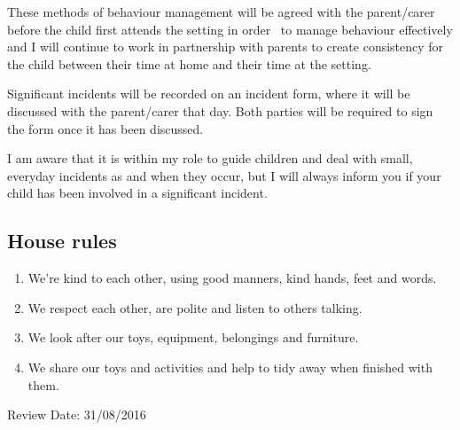 These methods of behaviour management will be agreed with the
parent/carer before the child first attends the setting in order ~to
manage behaviour effectively and I will continue to work in partnership
with parents to create consistency for the child between their time at
home and their time at the setting.

Significant incidents will be recorded on an incident form, where it
will be discussed with the parent/carer that day. Both parties will be
required to sign the form once it has been discussed.

I am aware that it is within my role to guide children and deal with
small, everyday incidents as and when they occur, but I will always
inform you if your child has been involved in a significant incident.

\subsection{House rules}

\begin{enumerate}
\item
  We're kind to each other, using good manners, kind hands, feet and
  words. ~
\item
  We respect each other, are polite and listen to others talking.~
\item
  We look after our toys, equipment, belongings and furniture.~
\item
  We share our toys and activities and help to tidy away when finished
  with them.~
\end{enumerate}

Review Date: 31/08/2016


